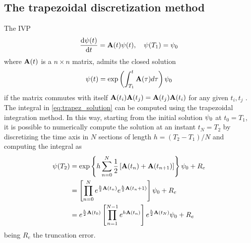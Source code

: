 \subsection{The trapezoidal discretization method}\label{ssec:trapezoidal_method}

The \ac{IVP}
\begin{equation}\label{eq:time_variant_ode}
    \dv{\psisol(\nttm)}{\nttm} = \matr{A}(\nttm) \psisol(\nttm), \quad \psisol(T_1) = \psisol[0]
\end{equation}
where $\matr{A}(\nttm)$ is a $n \times n$ matrix, admits the closed solution
\begin{equation}\label{eq:trapez_solution}
    \psisol(t) = \exp\left (\int_{T_1}^t \matr{A}(\tau) d\tau\right )\psisol[0]
\end{equation}
if the matrix commutes with itself $\matr{A}(t_i)\matr{A}(t_j) = \matr{A}(t_j)\matr{A}(t_i)$ for any given $t_i, t_j$ \cite{Aref2016c}.
The integral in \eqref{eq:trapez_solution} can be computed using the trapezoidal integration method. In this way, starting from the initial solution
$\psisol[0]$ at $t_0 = T_1$, it is possible to numerically compute the solution  at an instant $t_N = T_2$ by discretizing the time axis in $N$
sections of
length $h = (T_2 - T_1) /N$ and computing the integral as
\begin{align}\label{eq:trapez_integration}\nonumber
    \psisol(T_2) &= \exp\left\{ h\sum_{n=0}^{N}\dfrac{1}{2}\left[ \matr{A}(t_n) + \matr{A}(t_{n+1}) \right] \right\}\psisol[0] + R_e \\ \nonumber
               &= \left[\prod_{n=0}^{N} e^{\frac{h}{2}\matr{A}(t_n)}e^{\frac{h}{2}\matr{A}(t_n+1)}\right] \psisol[0] + R_e\\
               &= e^{\frac{h}{2}\matr{A}(t_0)}
                  \left[\prod_{n=1}^{N-1}e^{h\matr{A}(t_n)}\right]
                  e^{\frac{h}{2}\matr{A}(t_N)} \psisol[0] + R_e
\end{align}
being $R_e$ the truncation error.

